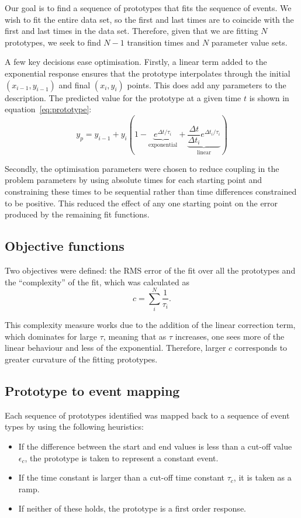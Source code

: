 Our goal is to find a sequence of prototypes that fits the sequence of events.  
We wish to fit the entire data set, so the first and last times are to coincide with the first and last times in the data set.
Therefore, given that we are fitting $N$ prototypes, we seek to find $N-1$ transition times and $N$ parameter value sets.

A few key decisions ease optimisation.  
Firstly, a linear term  added to the exponential response ensures that the prototype interpolates through the initial $(x_{i-1}, y_{i-1})$ and final $(x_{i}, y_{i})$ points.  
This does add any parameters to the description.  
The predicted value for the prototype at a given time $t$ is shown in equation~\ref{eq:prototype}:
\begin{equation}
  \label{eq:prototype}
  y_p = y_{i-1} + y_i \left (1 - \underbrace{e^{\Delta
        t/\tau_i}}_{\textrm{exponential}} + \underbrace{\frac{\Delta
        t}{\Delta t_i}e^{\Delta t_i/\tau_i}}_{\textrm{linear}} \right)
\end{equation}

Secondly, the optimisation parameters were chosen to reduce coupling in the problem parameters by using absolute times for each starting point and constraining these times to be sequential rather than time differences constrained to be positive.  
This reduced the effect of any one starting point on the error produced by the remaining fit functions.

\subsection{Objective functions}
Two objectives were defined: the RMS error of the fit over all the prototypes and the ``complexity'' of the fit, which was calculated as 
\begin{equation}
  c = \sum_i^{N} \frac{1}{\tau_i}.
\end{equation}

This complexity measure works due to the addition of the linear correction term, which dominates for large $\tau$, meaning that as $\tau$ increases, one sees more of the linear behaviour and less of the exponential.  
Therefore, larger $c$ corresponds to greater curvature of the fitting prototypes.

\subsection{Prototype to event mapping}
Each sequence of prototypes identified was mapped back to a sequence of event types by using the following heuristics:
\begin{itemize}
\item If the difference between the start and end values is less   than a cut-off value $\epsilon_c$, the prototype is taken to   represent a constant event.
\item If the time constant is larger than a cut-off time constant   $\tau_c$, it is taken as a ramp. 
\item If neither of these holds, the prototype is a first order response.
\end{itemize}

